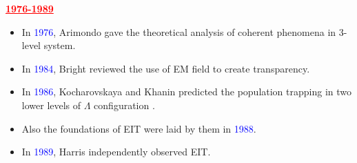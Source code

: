 \documentclass[9pt,aspectratio94]{beamer}
\begin{document}
\begin{frame}
 \begin{center}
      \textcolor{red}{\underline{ \textbf{1976-1989}}}
      \end{center}
     \begin{itemize}
         \item  In \textcolor{blue}{ 1976}, Arimondo gave the theoretical analysis of coherent phenomena in 3-level system.
         \item In \textcolor{blue}{1984}, Bright reviewed the use of EM field to create transparency.
         \item In \textcolor{blue}{1986}, Kocharovskaya and Khanin predicted the population trapping in two lower levels of $\Lambda$ configuration  .
     \item Also the foundations of EIT were laid by them in \textcolor{blue}{1988}.
\item In \textcolor{blue}{1989}, Harris independently observed EIT. 
     \end{itemize}
     \end{frame}
\end{document}
